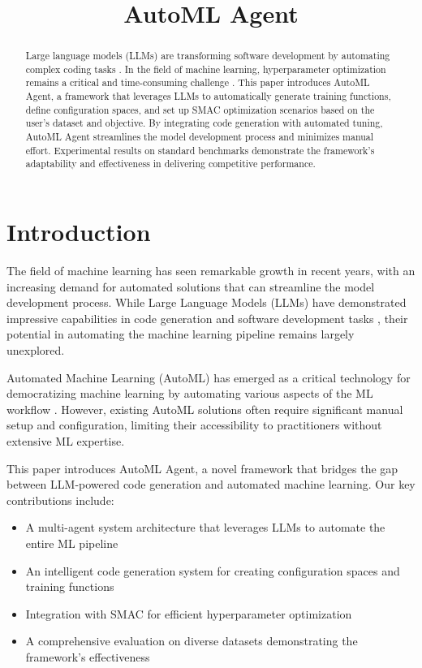 \documentclass[11pt]{article}
\title{AutoML Agent}
\author[1]{\nameemail{Amirreza Alasti}{amirreza.alasti@stud.uni-hannover.de}}
\author[1,2]{\nameemail{Dr. rer. nat. Marcel Wever}{email2@example.com}}
\affil[1]{Leibniz University Hannover}
\affil[2]{Leibniz AI Academy}
\begin{document}
\maketitle

\begin{abstract}
Large language models (LLMs) are transforming software development by automating complex coding tasks \citep{llms_code}. In the field of machine learning, hyperparameter optimization remains a critical and time-consuming challenge \citep{automl_survey}. This paper introduces AutoML Agent, a framework that leverages LLMs to automatically generate training functions, define configuration spaces, and set up SMAC optimization scenarios based on the user's dataset and objective. By integrating code generation with automated tuning, AutoML Agent streamlines the model development process and minimizes manual effort. Experimental results on standard benchmarks demonstrate the framework's adaptability and effectiveness in delivering competitive performance.
\end{abstract}

\section{Introduction}
The field of machine learning has seen remarkable growth in recent years, with an increasing demand for automated solutions that can streamline the model development process. While Large Language Models (LLMs) have demonstrated impressive capabilities in code generation and software development tasks \citep{llms_code}, their potential in automating the machine learning pipeline remains largely unexplored.

Automated Machine Learning (AutoML) has emerged as a critical technology for democratizing machine learning by automating various aspects of the ML workflow \citep{automl_survey}. However, existing AutoML solutions often require significant manual setup and configuration, limiting their accessibility to practitioners without extensive ML expertise.

This paper introduces AutoML Agent, a novel framework that bridges the gap between LLM-powered code generation and automated machine learning. Our key contributions include:

\begin{itemize}
    \item A multi-agent system architecture that leverages LLMs to automate the entire ML pipeline
    \item An intelligent code generation system for creating configuration spaces and training functions
    \item Integration with SMAC \citep{smac3} for efficient hyperparameter optimization
    \item A comprehensive evaluation on diverse datasets demonstrating the framework's effectiveness
\end{itemize}
\end{document}
